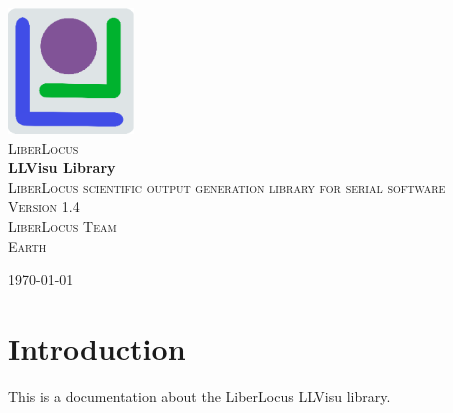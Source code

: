 \documentclass{article}
\begin{document}
\begin{titlepage}
\begin{center}

\includegraphics[width=0.25\textwidth]{figures/LLlogo.eps}~\\[1cm]

\textsc{\LARGE LiberLocus}\\[1.5cm]

{ \huge \bfseries LLVisu Library}\\[0.4cm]

\textsc{\Large LiberLocus scientific output generation library for serial software}\\[0.5cm]

\textsc{Version 1.4}\\[3.5cm]

\textsc{\Large LiberLocus Team}\\[1.5cm]

\textsc{\Large Earth}\\[0.5cm]

\vfill

{\large \today}

\end{center}
\end{titlepage}


\section{Introduction}

This is a documentation about the LiberLocus LLVisu library.

\newpage
\end{document}
